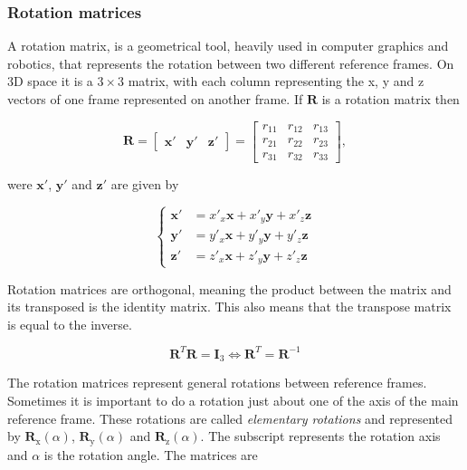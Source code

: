 \subsubsection{Rotation matrices}
\label{subsubsec:rotation_matrices}

A rotation matrix, is a geometrical tool, heavily used in computer graphics and robotics, that represents the rotation between two different reference frames. On 3D space it is a $3\times3$ matrix, with each column representing the x, y and z vectors of one frame represented on another frame. If $\boldsymbol{R}$ is a rotation matrix then

\begin{equation}
    \boldsymbol{R} = \begin{bmatrix} \boldsymbol{x'} & \boldsymbol{y'} & \boldsymbol{z'}\end{bmatrix} = \begin{bmatrix} r_{11} & r_{12} & r_{13}\\
    r_{21} & r_{22} & r_{23}\\
    r_{31} & r_{32} & r_{33}\end{bmatrix},
\end{equation}

were $\boldsymbol{x'}$, $\boldsymbol{y'}$ and $\boldsymbol{z'}$ are given by

\begin{equation}
    \left\{
    \begin{aligned}
        \boldsymbol{x'} &= x'_x\boldsymbol{x} + x'_y\boldsymbol{y} + x'_z\boldsymbol{z} \\
        \boldsymbol{y'} &= y'_x\boldsymbol{x} + y'_y\boldsymbol{y} + y'_z\boldsymbol{z} \\
        \boldsymbol{z'} &= z'_x\boldsymbol{x} + z'_y\boldsymbol{y} + z'_z\boldsymbol{z}
    \end{aligned}
    \right.
\end{equation}

Rotation matrices are orthogonal, meaning the product between the matrix and its transposed is the identity matrix. This also means that the transpose matrix is equal to the inverse.

\begin{equation}
    \boldsymbol{R}^T \boldsymbol{R} = \boldsymbol{I}_3 \Leftrightarrow \boldsymbol{R}^T = \boldsymbol{R}^{-1}
\end{equation}

The rotation matrices represent general rotations between reference frames. Sometimes it is important to do a rotation just about one of the axis of the main reference frame. These rotations are called \emph{elementary rotations} and represented by $\boldsymbol{R}_{\text{x}}(\alpha)$, $\boldsymbol{R}_{\text{y}}(\alpha)$ and $\boldsymbol{R}_{\text{z}}(\alpha)$. The subscript represents the rotation axis and $\alpha$ is the rotation angle. The matrices are

